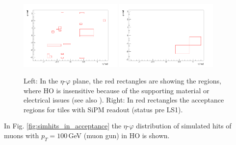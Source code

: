 			\begin{figure}[htbp]
				\centering
				\includegraphics[width=0.45\textwidth]{Figures/erdogan/deadregions.png}
				\includegraphics[width=0.45\textwidth]{Figures/erdogan/sipmregions.png}
				\caption{Left: In the $\eta$-$\varphi$ plane, the red rectangles are showing the regions, where HO is insensitive because of the supporting material or electrical issues (see also \cite{JINST}).
				Right: In red rectangles the acceptance regions for tiles with SiPM readout (status pre LS1).}
				\label{fig:ho_acceptance}
			\end{figure}
			In Fig. \ref{fig:simhits_in_acceptance} the $\eta$-$\varphi$ distribution of simulated hits of muons with $p_T = 100$\,GeV (muon gun) in HO is shown.
